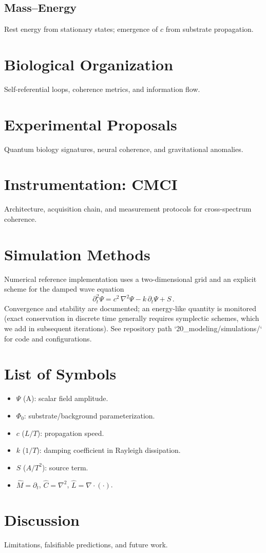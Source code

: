 \documentclass[12pt]{article}
\begin{document}
\subsection{Mass--Energy}
Rest energy from stationary states; emergence of $c$ from substrate propagation.

\section{Biological Organization}
Self-referential loops, coherence metrics, and information flow.

\section{Experimental Proposals}
Quantum biology signatures, neural coherence, and gravitational anomalies.

\section{Instrumentation: CMCI}
Architecture, acquisition chain, and measurement protocols for cross-spectrum coherence.

\section{Simulation Methods}
Numerical reference implementation uses a two-dimensional grid and an explicit scheme for the damped wave equation
\begin{equation}
  \partial_t^2 \Psi = c^2\,\nabla^2\Psi - k\,\partial_t\Psi + S\, .
\end{equation}
Convergence and stability are documented; an energy-like quantity is monitored (exact conservation in discrete time generally requires symplectic schemes, which we add in subsequent iterations). See repository path `20_modeling/simulations/` for code and configurations.

\section{List of Symbols}
\begin{itemize}
  \item $\Psi$ (A): scalar field amplitude.
  \item $\Phi_0$: substrate/background parameterization.
  \item $c$ ($L/T$): propagation speed.
  \item $k$ ($1/T$): damping coefficient in Rayleigh dissipation.
  \item $S$ ($A/T^2$): source term.
  \item $\hat M=\partial_t$, $\hat C=\nabla^2$, $\hat L=\nabla\cdot(\cdot)$.
\end{itemize}

\section{Discussion}
Limitations, falsifiable predictions, and future work.

\printbibliography
\end{document}

